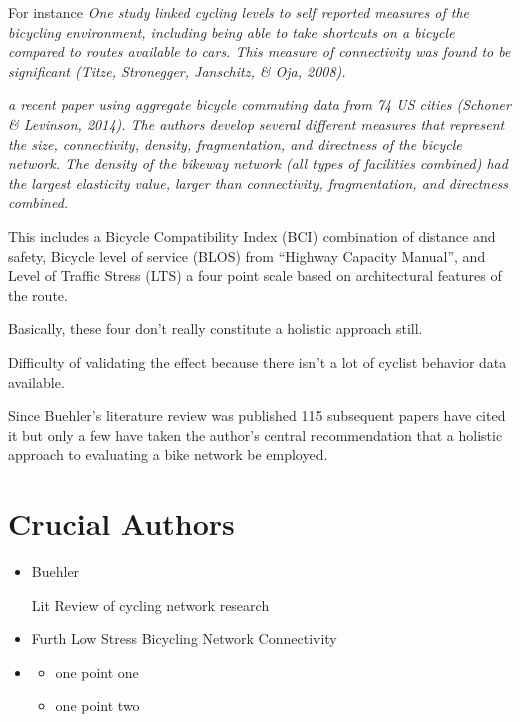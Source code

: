 \documentclass[11pt]{article} %
\begin{document}
	For instance \textit{One study linked cycling levels to self reported measures of the bicycling environment, including being able to take shortcuts on a bicycle compared to routes available to cars. This measure of connectivity was found to be significant (Titze, Stronegger, Janschitz, \& Oja, 2008).}
	
	\textit{ a recent paper using aggregate bicycle commuting data from 74 US cities (Schoner \& Levinson, 2014). The authors develop several different measures that represent the size, connectivity, density, fragmentation, and directness of the bicycle network. The density of the bikeway network (all types of facilities combined) had the largest elasticity value, larger than connectivity, fragmentation, and directness combined.}
	
	This includes a Bicycle Compatibility Index (BCI) combination of distance and safety, Bicycle level of service (BLOS) from ``Highway Capacity Manual'', \cite{Lowry} and Level of Traffic Stress (LTS) \cite{Mekuria and Furth} a four point scale based on architectural features of the route.
	
	Basically, these four don't really constitute a holistic approach still. 
	
	Difficulty of validating the effect because there isn't a lot of cyclist behavior data available.
	
	
Since Buehler's literature review was published 115 subsequent papers have cited it but only a few have taken the author's central recommendation that a holistic approach to evaluating a bike network be employed. 
	
	
	
\section{Crucial Authors}



\begin{itemize}
\item Buehler \cite{Buehler2016}

Lit Review of cycling network research

\item Furth Low Stress Bicycling Network Connectivity

\item 
  \begin{itemize}
  \item one point one
  \item one point two
  \end{itemize}
\end{itemize}
\end{document}

